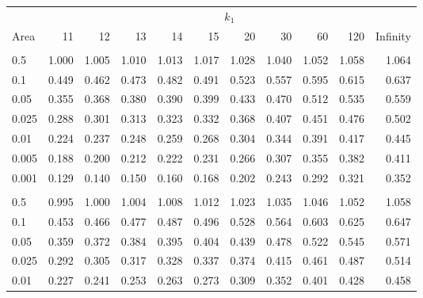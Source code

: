 \documentclass[
]{article}
\begin{document}
\begin{longtable}[t]{lrrrrrrrrrr}
\toprule
\multicolumn{1}{c}{ } & \multicolumn{10}{c}{$k_1$} \\
\cmidrule(l{3pt}r{3pt}){2-11}
Area & 11 & 12 & 13 & 14 & 15 & 20 & 30 & 60 & 120 & Infinity\\
\midrule
\addlinespace[0.3em]
\multicolumn{11}{l}{\textbf{$k_2=11$}}\\
\hspace{1em}0.5 & 1.000 & 1.005 & 1.010 & 1.013 & 1.017 & 1.028 & 1.040 & 1.052 & 1.058 & 1.064\\
\hspace{1em}0.1 & 0.449 & 0.462 & 0.473 & 0.482 & 0.491 & 0.523 & 0.557 & 0.595 & 0.615 & 0.637\\
\hspace{1em}0.05 & 0.355 & 0.368 & 0.380 & 0.390 & 0.399 & 0.433 & 0.470 & 0.512 & 0.535 & 0.559\\
\hspace{1em}0.025 & 0.288 & 0.301 & 0.313 & 0.323 & 0.332 & 0.368 & 0.407 & 0.451 & 0.476 & 0.502\\
\hspace{1em}0.01 & 0.224 & 0.237 & 0.248 & 0.259 & 0.268 & 0.304 & 0.344 & 0.391 & 0.417 & 0.445\\
\hspace{1em}0.005 & 0.188 & 0.200 & 0.212 & 0.222 & 0.231 & 0.266 & 0.307 & 0.355 & 0.382 & 0.411\\
\hspace{1em}0.001 & 0.129 & 0.140 & 0.150 & 0.160 & 0.168 & 0.202 & 0.243 & 0.292 & 0.321 & 0.352\\
\addlinespace[0.3em]
\multicolumn{11}{l}{\textbf{$k_2=12$}}\\
\hspace{1em}0.5 & 0.995 & 1.000 & 1.004 & 1.008 & 1.012 & 1.023 & 1.035 & 1.046 & 1.052 & 1.058\\
\hspace{1em}0.1 & 0.453 & 0.466 & 0.477 & 0.487 & 0.496 & 0.528 & 0.564 & 0.603 & 0.625 & 0.647\\
\hspace{1em}0.05 & 0.359 & 0.372 & 0.384 & 0.395 & 0.404 & 0.439 & 0.478 & 0.522 & 0.545 & 0.571\\
\hspace{1em}0.025 & 0.292 & 0.305 & 0.317 & 0.328 & 0.337 & 0.374 & 0.415 & 0.461 & 0.487 & 0.514\\
\hspace{1em}0.01 & 0.227 & 0.241 & 0.253 & 0.263 & 0.273 & 0.309 & 0.352 & 0.401 & 0.428 & 0.458\\

\end{longtable}
\end{document}
